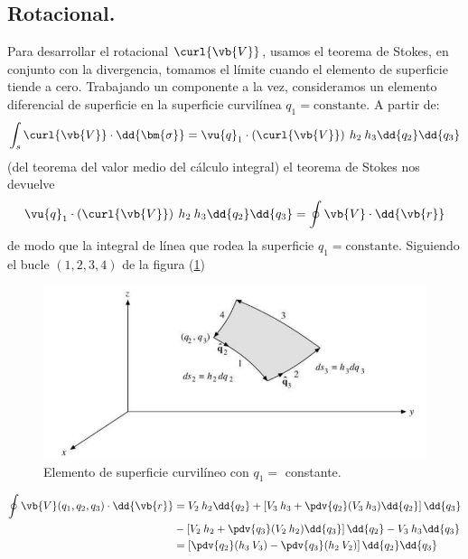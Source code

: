 \subsection{Rotacional.}
Para desarrollar el rotacional $\curl{\vb{V}}$, usamos el teorema de Stokes, en conjunto con la divergencia, tomamos el límite cuando el elemento de superficie tiende a cero. Trabajando un componente a la vez, consideramos un elemento diferencial de superficie en la superficie curvilínea $q_{1} = \text{constante}$. A partir de:
\begin{align}
\int_{s} \curl{\vb{V}} \cdot \dd{\bm{\sigma}} = \vu{q}_{1} \cdot \left( \curl{\vb{V}} \right) \: h_{2} \: h_{3} \dd{q_{2}} \dd{q_{3}}
\label{eq:ecuacion_02_23}
\end{align}
(del teorema del valor medio del cálculo integral) el teorema de Stokes nos devuelve
\begin{align}
\vu{q}_{1} \cdot \left( \curl{\vb{V}} \right) \: h_{2} \: h_{3} \dd{q_{2}} \dd{q_{3}} = \oint \vb{V} \cdot \dd{\vb{r}}
\label{eq:ecuacion_02_24}
\end{align}
de modo que la integral de línea que rodea la superficie $q_{1}=\text{constante}$. Siguiendo el bucle $(1, 2, 3, 4)$ de la figura (\ref{fig:figura_002})
\begin{figure}[H]
    \centering
    \includegraphics[scale=0.5]{Imagenes/ElementoCurvilineo_02.png}
    \caption{Elemento de superficie curvilíneo con $q_{1}=$ constante.}
    \label{fig:figura_002}
\end{figure}
\begin{align}
\begin{aligned}
\oint \vb{V} (q_{1}, q_{2}, q_{3}) \cdot \dd{\vb{r}} &= V_{2} \: h_{2} \dd{q_{2}} + \left[ V_{3} \: h_{3} + \pdv{q_{2}} (V_{3} \: h_{3}) \dd{q_{2}} \right] \dd{q_{3}} \\
&- \left[ V_{2} \: h_{2} + \pdv{q_{3}} (V_{2} \: h_{2}) \dd{q_{3}} \right] \dd{q_{2}} - V_{3} \: h_{3} \dd{q_{3}} \\
&= \left[ \pdv{q_{2}} (h_{3} \: V_{3}) - \pdv{q_{3}} (h_{2} \: V_{2}) \right] \dd{q_{2}} \dd{q_{3}}
\end{aligned}
\label{eq:ecuacion_02_25}
\end{align}
